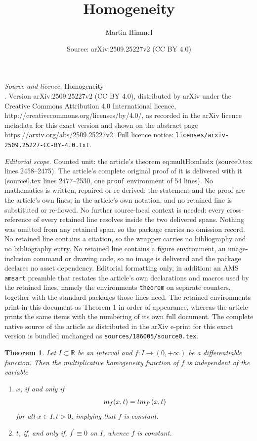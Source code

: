 \documentclass[10pt,a4paper]{amsart}
\title{Homogeneity\\}
\author{Martin Himmel}
\date{Source: arXiv:2509.25227v2 (CC BY 4.0)}
\newtheorem{theorem}{Theorem}
\newcommand{\R}{{\mathbb{R}}}
\newcommand{\mh}{\textsc{m}}
\begin{document}
\maketitle

\noindent\emph{Source and licence.} Homogeneity\\. Version arXiv:2509.25227v2 (CC BY 4.0), distributed by arXiv under the Creative Commons Attribution 4.0 International licence, http://creativecommons.org/licenses/by/4.0/, as recorded in the arXiv licence metadata for this exact version and shown on the abstract page https://arxiv.org/abs/2509.25227v2. Full licence notice: \texttt{licenses/arxiv-2509.25227-CC-BY-4.0.txt}.\par\smallskip

\noindent\textit{Editorial scope.} Counted unit: the article's theorem eq:multHomIndx (source0.tex lines 2458--2475). The article's complete original proof of it is delivered with it (source0.tex lines 2477--2530, one \texttt{proof} environment of 54 lines). No mathematics is written, repaired or re-derived: the statement and the proof are the article's own lines, in the article's own notation, and no retained line is substituted or re-flowed.  No further source-local context is needed: every cross-reference of every retained line resolves inside the two delivered spans.  Nothing was omitted from any retained span, so the package carries no omission record.  No retained line contains a citation, so the wrapper carries no bibliography and no bibliography entry.  No retained line contains a figure environment, an image-inclusion command or drawing code, so no image is delivered and the package declares no asset dependency.  Editorial formatting only, in addition: an AMS \texttt{amsart} preamble that restates the article's own declarations and macros used by the retained lines, namely the environments \texttt{theorem} on separate counters, together with the standard packages those lines need.  The retained environments print in this document as Theorem 1 in order of appearance, whereas the article prints the same items with the numbering of its own full document.  The complete native source of the article as distributed in the arXiv e-print for this exact version is bundled unchanged as \texttt{sources/186005/source0.tex}.
\begin{theorem}
Let $I \subset \R$ be an interval and $f:I \to (0, +\infty)$ be a differentiable function.
Then the multiplicative homogeneity function of $f$ is independent of the variable
\begin{enumerate}
	\item 
	$x$, if and only if
	\begin{equation*}
	\mh_f(x,t) = t \mh_{f^\prime} (x,t)
	\label{eq:multHomIndx}
	\end{equation*}
	for all $x \in I, t>0$,
    implying that $f$ is constant.
	
	\item 
	$t$, if, and only if, $f^\prime \equiv 0$ on $I$,
     whence $f$ is constant.
\end{enumerate}
\end{theorem}
\end{document}
